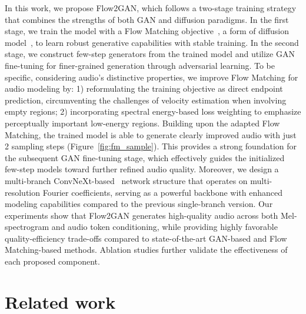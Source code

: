 \documentclass{article} %
\begin{document}
In this work, we propose Flow2GAN, which follows a two-stage training strategy that combines the strengths of both GAN and diffusion paradigms. In the first stage, we train the model with a Flow Matching objective~\citep{fm1,fm2}, a form of diffusion model~\citep{kingma2023understanding}, to learn robust generative capabilities with stable training. In the second stage, we construct few-step generators from the trained model and utilize GAN fine-tuning for finer-grained generation through adversarial learning. 
To be specific, considering audio's distinctive properties, we improve Flow Matching for audio modeling by: 1) reformulating the training objective as direct endpoint prediction, circumventing the challenges of velocity estimation when involving empty regions; 2) incorporating spectral energy-based loss weighting to emphasize perceptually important low-energy regions. 
Building upon the adapted Flow Matching, the trained model is able to generate clearly improved audio with just 2 sampling steps (Figure~\ref{fig:fm_sample}). This provides a strong foundation for the subsequent GAN fine-tuning stage, which effectively guides the initialized few-step models toward further refined audio quality. Moreover, we design a multi-branch ConvNeXt-based~\citep{convnext} network structure that operates on multi-resolution Fourier coefficients, serving as a powerful backbone with enhanced modeling capabilities compared to the previous single-branch version. 
Our experiments show that Flow2GAN generates high-quality audio across both Mel-spectrogram and audio token conditioning, while providing highly favorable quality-efficiency trade-offs compared to state-of-the-art GAN-based and Flow Matching-based methods.
Ablation studies further validate the effectiveness of each proposed component. 






\vspace{-1em}
\section{Related work}
\vspace{-0.9em}
\end{document}
